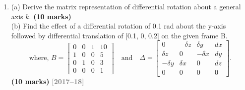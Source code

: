 \documentclass[12pt,a3paper]{article}
\newcommand{\yr}[1]{\hfill\textcolor{gray}{\small\textbf{[#1]}}}
\newcommand{\mk}[1]{\textcolor{orange!70!black}{\small\textbf{(#1 marks)}}}
\begin{document}
\begin{enumerate}
\begin{tcolorbox}[enhanced,breakable,ansbox,colback=cB!4,colframe=cB,
  boxrule=0.8pt,arc=5pt,
  title={\textbf{Answer}},fonttitle=\bfseries\color{white},
  colbacktitle=cB]
\textbf{Building the rotation matrix} (columns = new axes in old frame):
\[
  {}^X_UR_y(\theta)
  = \begin{bmatrix}
      \hat{u} & \hat{v} & \hat{w}
    \end{bmatrix}
  = \begin{bmatrix}
      \cos\theta  & 0 & \sin\theta \\
      0           & 1 & 0          \\
      -\sin\theta & 0 & \cos\theta
    \end{bmatrix}
\]

\[
  \boxed{R_y(\theta) =
  \begin{bmatrix}
    \cos\theta  & 0 & \sin\theta \\
    0           & 1 & 0          \\
    -\sin\theta & 0 & \cos\theta
  \end{bmatrix}}
\]

\textbf{Key properties (verified):}
\begin{itemize}[leftmargin=1.5em, itemsep=2pt]
  \item $\det(R_y) = \cos^2\theta + \sin^2\theta = 1$ \checkmark
  \item $R_y^T = R_y^{-1}$ (orthogonal) \checkmark
  \item At $\theta=0$: $R_y = I$ \checkmark
  \item At $\theta=90\textdegree$: $\hat{x}\mapsto-\hat{z}$,
    $\hat{z}\mapsto\hat{x}$ \checkmark
\end{itemize}

\end{tcolorbox}

\item \label{qlabel:C2-Q5}
(a) Derive the matrix representation of differential rotation about a
general axis $k$. \mk{10}\\
(b) Find the effect of a differential rotation of 0.1 rad about the y-axis followed by differential translation of [0.1, 0, 0.2] on the given frame B.
\[
  \text{where, } B = 
  \begin{bmatrix} 
    0 & 0 & 1 & 10 \\ 
    1 & 0 & 0 & 5 \\ 
    0 & 1 & 0 & 3 \\ 
    0 & 0 & 0 & 1 
  \end{bmatrix} 
  \quad \text{and} \quad 
  \Delta = 
  \begin{bmatrix} 
    0 & -\delta z & \delta y & dx \\ 
    \delta z & 0 & -\delta x & dy \\ 
    -\delta y & \delta x & 0 & dz \\ 
    0 & 0 & 0 & 0 
  \end{bmatrix}.
\]
\mk{10}
\yr{2017--18}


\end{enumerate}
\end{document}
